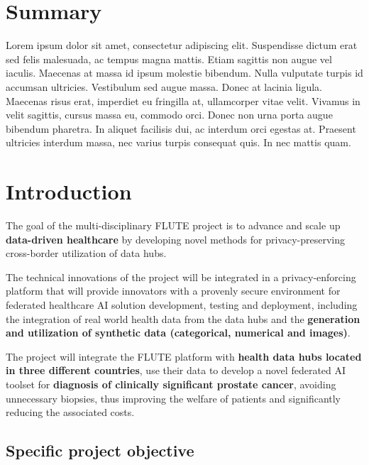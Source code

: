\documentclass[a4paper,12pt]{article}
\begin{document}
\titlepagex



\section*{Summary}

Lorem ipsum dolor sit amet, consectetur adipiscing elit. Suspendisse dictum erat sed felis malesuada, ac tempus magna mattis. Etiam sagittis non augue vel iaculis. Maecenas at massa id ipsum molestie bibendum. Nulla vulputate turpis id accumsan ultricies. Vestibulum sed augue massa. Donec at lacinia ligula. Maecenas risus erat, imperdiet eu fringilla at, ullamcorper vitae velit. Vivamus in velit sagittis, cursus massa eu, commodo orci. Donec non urna porta augue bibendum pharetra. In aliquet facilisis dui, ac interdum orci egestas at. Praesent ultricies interdum massa, nec varius turpis consequat quis. In nec mattis quam.

\section{Introduction}

The goal of the multi-disciplinary FLUTE project is to advance and scale up \textbf{data-driven healthcare} by
developing novel methods for privacy-preserving cross-border utilization of data hubs. 

The technical innovations of the project will be integrated in a privacy-enforcing platform that will provide
innovators with a provenly secure environment for federated healthcare AI solution development, testing
and deployment, including the integration of real world health data from the data hubs and the \textbf{generation and
utilization of synthetic data (categorical, numerical and images)}.

The project will integrate the FLUTE platform with \textbf{health data hubs located in three different countries}, use their data to develop a novel federated AI toolset for \textbf{diagnosis of clinically significant prostate cancer}, avoiding unnecessary biopsies, thus improving the welfare of patients and significantly reducing the associated costs.


\subsection{Specific project objective}
\end{document}

